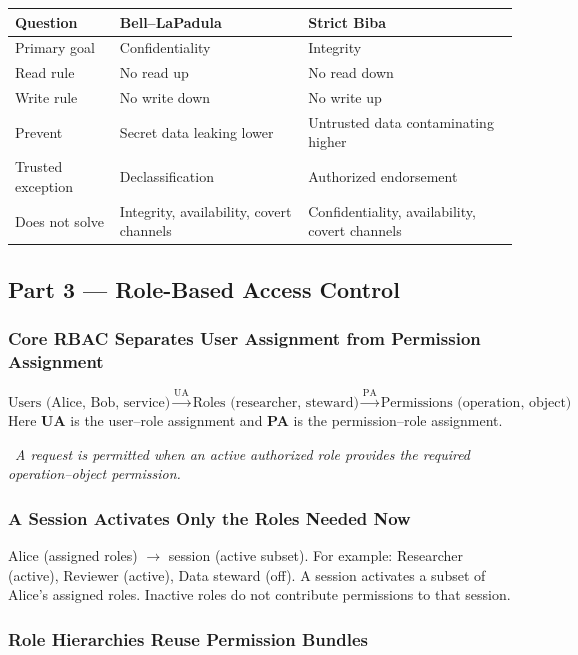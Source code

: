 \documentclass[hidelinks]{article}
\newcommand{\callout}[1]{\par\smallskip\noindent{\color{capri}$\blacktriangleright$}\ \textit{#1}\par\smallskip}
\begin{document}
\begin{center}
\color{white}
\begin{tabular}{p{2.8cm}p{5.0cm}p{5.0cm}}
\hline
\textbf{Question} & \textbf{Bell--LaPadula} & \textbf{Strict Biba}\\ \hline
Primary goal & Confidentiality & Integrity\\
Read rule & No read up & No read down\\
Write rule & No write down & No write up\\
Prevent & Secret data leaking lower & Untrusted data contaminating higher\\
Trusted exception & Declassification & Authorized endorsement\\
Does not solve & Integrity, availability, covert channels & Confidentiality, availability, covert channels\\ \hline
\end{tabular}
\end{center}

\subsection{Part 3 --- Role-Based Access Control}

\subsubsection{Core RBAC Separates User Assignment from Permission Assignment}

\[
\text{Users (Alice, Bob, service)} \xrightarrow{\text{UA}} \text{Roles (researcher, steward)} \xrightarrow{\text{PA}} \text{Permissions (operation, object)}
\]
Here \textbf{UA} is the user--role assignment and \textbf{PA} is the permission--role assignment.

\callout{A request is permitted when an active authorized role provides the required operation--object permission.}

\subsubsection{A Session Activates Only the Roles Needed Now}

Alice (assigned roles) $\to$ session (active subset). For example: Researcher (active), Reviewer (active), Data steward (off). A session activates a subset of Alice's assigned roles. Inactive roles do not contribute permissions to that session.

\subsubsection{Role Hierarchies Reuse Permission Bundles}
\end{document}
